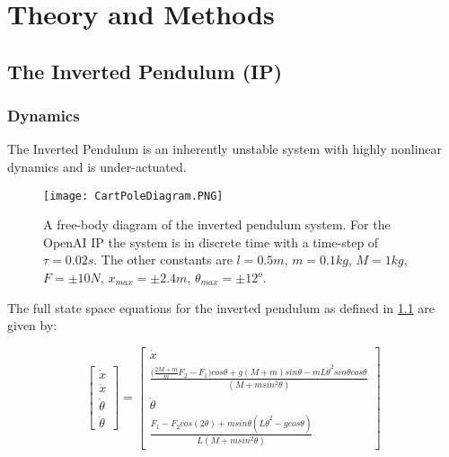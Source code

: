 \documentclass[../main.tex]{subfiles}
\begin{document}
\onlyinsubfile{\tableofcontents{}}

\chapter{Theory and Methods}

\section{The Inverted Pendulum (IP)}

\subsection{Dynamics}
The Inverted Pendulum is an inherently unstable system with highly nonlinear dynamics and is under-actuated.

\begin{figure}[ht]
    \centering
    \texttt{[image: CartPoleDiagram.PNG]}
    \caption{A free-body diagram of the inverted pendulum system. For the OpenAI IP the system is in discrete time with a time-step of $\tau =  0.02s$. The other constants are $l = 0.5m$, $m=0.1kg$, $M=1kg$, $F=\pm10N$, $x_{max}=\pm 2.4m$, $\theta_{max} = \pm 12^o$.}
    \label{fig:invpen}
\end{figure}

The full state space equations for the inverted pendulum as defined in \cref{fig:invpen} are given by:

\begin{equation}
\begin{bmatrix} \dot{x} \\ \ddot{x} \\ \dot{\theta} \\ \ddot{\theta} \end{bmatrix}  =
\begin{bmatrix} \dot{x} \\ \frac{\big(\frac{2M+m}{m}F_2-F_1\big)cos\theta + g(M+m)sin\theta - mL\dot{\theta}^2 sin\theta cos\theta}{(M + m sin^2\theta)} \\ \dot{\theta} \\ \frac{F_1 - F_2cos(2\theta)+ msin\theta(L\dot{\theta}^2-g cos\theta)}{L(M+m sin^2\theta)} \end{bmatrix}
\end{equation}
\end{document}
